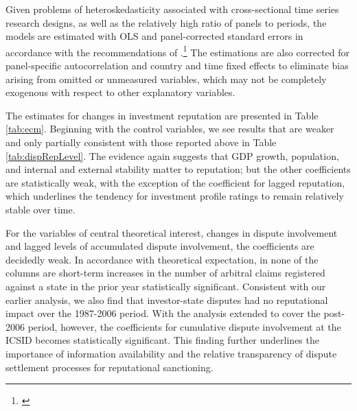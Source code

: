 \documentclass[12pt,onesided]{amsart}
\begin{document}
Given problems of heteroskedasticity associated with cross-sectional time series research designs, as well as the relatively high ratio of panels to periods, the models are estimated with OLS and panel-corrected standard errors in accordance with the recommendations of \citeauthor{beck:katz:1995}.\footnote{\citet{beck:katz:1995}} The estimations are also corrected for panel-specific autocorrelation and country and time fixed effects to eliminate bias arising from omitted or unmeasured variables, which may not be completely exogenous with respect to other explanatory variables.

The estimates for changes in investment reputation are presented in Table \ref{tab:ecm}. Beginning with the control variables, we see results that are weaker and only partially consistent with those reported above in Table \ref{tab:dispRepLevel}. The evidence again suggests that GDP growth, population, and internal and external stability matter to reputation; but the other coefficients are statistically weak, with the exception of the coefficient for lagged reputation, which underlines the tendency for investment profile ratings to remain relatively stable over time. 

For the variables of central theoretical interest, changes in dispute involvement and lagged levels of accumulated dispute involvement, the coefficients are decidedly weak. In accordance with theoretical expectation, in none of the columns are short-term increases in the number of arbitral claims registered against a state in the prior year statistically significant. Consistent with our earlier analysis, we also find that investor-state disputes had no reputational impact over the 1987-2006 period. With the analysis extended to cover the post-2006 period, however, the coefficients for cumulative dispute involvement at the ICSID becomes statistically significant. This finding further underlines the importance of information availability and the relative transparency of dispute settlement processes for reputational sanctioning. 
\end{document}
